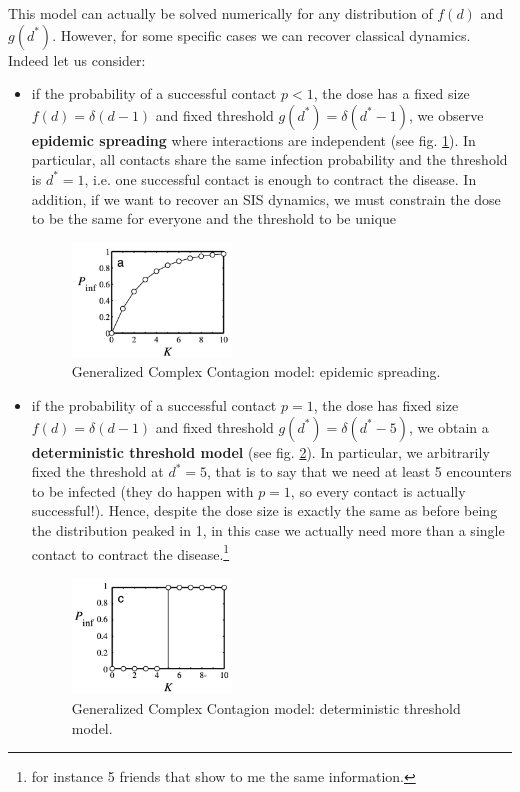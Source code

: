 \documentclass[../main/main.tex]{subfiles}
\begin{document}
This model can actually be solved numerically for any distribution of $f(d)$ and $g(d^*)$. However, for some specific cases we can recover classical dynamics. Indeed let us consider:
\begin{itemize}

\item if the probability of a successful contact \( p<1 \), the dose has a fixed size $f(d) = \delta(d-1)$ and fixed threshold $g(d^*) = \delta(d^*-1)$, we observe \textbf{epidemic spreading} where interactions are independent (see fig. \ref{fig:11_1}). In particular, all contacts share the same infection probability and the threshold is $d^* = 1$, i.e. one successful contact is enough to contract the disease. In addition, if we want to recover an SIS dynamics, we must constrain the dose to be the same for everyone and the threshold to be unique

\begin{figure}[h!]
\centering
\includegraphics[width=0.4\textwidth]{../lessons/image/11/1.png}
\caption{\label{fig:11_1} Generalized Complex Contagion model: epidemic spreading.}
\end{figure}


\item if the probability of a successful contact \( p=1 \), the dose has fixed size $f(d) = \delta(d-1)$ and fixed threshold $g(d^*) = \delta(d^*-5)$, we obtain a \textbf{deterministic threshold model} (see fig. \ref{fig:11_2}). In particular, we arbitrarily fixed the threshold at \( d^*=5 \), that is to say that we need at least 5 encounters to be infected (they do happen with $p=1$, so every contact is actually successful!). Hence, despite the dose size is exactly the same as before being the distribution peaked in 1, in this case we actually need more than a single contact to contract the disease.\footnote{for instance 5 friends that show to me the same information.}

\begin{figure}[h!]
\centering
\includegraphics[width=0.4\textwidth]{../lessons/image/11/2.png}
\caption{\label{fig:11_2} Generalized Complex Contagion model: deterministic threshold model.}
\end{figure}


\end{itemize}
\end{document}
